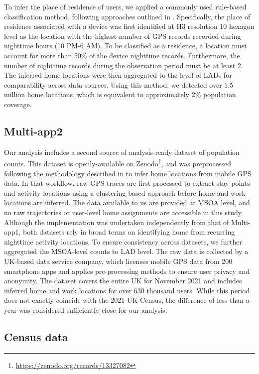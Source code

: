 \documentclass[]{rsos}%
\begin{document}
To infer the place of residence of users, we applied a commonly used
rule-based classification method, following approaches outlined in
\citep{zhong25, unstatsMPDMS2025, Verma2024}. Specifically, the place of residence
associated with a device was first identified at H3 resolution 10
hexagon level as the location with the highest number of GPS records
recorded during nighttime hours (10 PM-6 AM). To be classified as a
residence, a location must account for more than 50\% of the device
nighttime records. Furthermore, the number of nighttime records during
the observation period must be at least 2. The inferred home locations
were then aggregated to the level of LADs for comparability across data
sources. Using this method, we detected over 1.5 million home locations,
which is equivalent to approximately 2\% population coverage.

\subsection{Multi-app2}\label{multi-app2}

Our analysis includes a second source of analysis-ready dataset of
population counts. This dataset is openly-available on Zenodo\footnote{\url{https://zenodo.org/records/13327082}}, and
was preprocessed following the methodology described in \citep{zhong25} to
infer home locations from mobile GPS data. In that workflow, raw GPS
traces are first processed to extract stay points and activity locations
using a clustering-based approach before home and work locations are
inferred. The data available to us are provided at MSOA level, and no
raw trajectories or user-level home assignments are accessible in this
study. Although the implementation was undertaken independently from
that of Multi-app1, both datasets rely in broad terms on identifying
home from recurring nighttime activity locations. To ensure consistency
across datasets, we further aggregated the MSOA-level counts to LAD
level. The raw data is collected by a UK-based data service company,
which licenses mobile GPS data from 200 smartphone apps and applies
pre-processing methods to ensure user privacy and anonymity. The dataset
covers the entire UK for November 2021 and includes inferred home and
work locations for over 630 thousand users. While this period does not
exactly coincide with the 2021 UK Census, the difference of less than a
year was considered sufficiently close for our analysis.

\subsection{Census data}\label{census-data}
\end{document}

